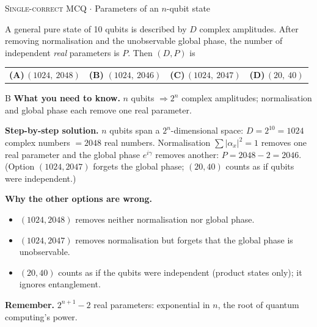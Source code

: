\documentclass[11pt,a4paper]{article}
\newcommand{\optlabel}[1]{\textbf{(#1)}}
\newcommand{\correctlabel}[1]{\textcolor{okgreen}{\textbf{(#1)}\,\ding{51}}}
\newenvironment{qitem}[1]{\begin{list}{}{\setlength{\leftmargin}{3.3em}\setlength{\labelwidth}{3.1em}%
  \setlength{\labelsep}{0.2em}\setlength{\topsep}{3pt}\setlength{\parsep}{3pt}}\item[\textbf{Q.#1}\hfill]}{\end{list}}
\newcommand{\qsep}{\par\vspace{2pt}{\color{black!15}\hrule}\vspace{4pt}}
\newcommand{\qmeta}[2]{{\footnotesize\color{black!60}\textsc{#1} \;$\cdot$\; #2}\par}
\begin{document}
\begin{qitem}{9}
\qmeta{Single-correct MCQ}{Parameters of an $n$-qubit state}
A general pure state of 10 qubits is described by $D$ complex amplitudes. After removing normalisation and
the unobservable global phase, the number of independent \emph{real} parameters is $P$. Then $(D, P)$ is
\par\smallskip\noindent\begin{tabularx}{\linewidth}{@{}*{4}{L}@{}}
\optlabel{A}\,$(1024,\ 2048)$ & \correctlabel{B}\,$(1024,\ 2046)$ & \optlabel{C}\,$(1024,\ 2047)$ & \optlabel{D}\,$(20,\ 40)$
\end{tabularx}
\end{qitem}
\begin{solbox}{B}
\textbf{\color{brand}What you need to know.} $n$ qubits $\Rightarrow 2^n$ complex amplitudes; normalisation and global phase each remove one real parameter.

\textbf{\color{brand}Step-by-step solution.} $n$ qubits span a $2^n$-dimensional space: $D = 2^{10} = 1024$ complex numbers $= 2048$ real numbers.
Normalisation $\sum|\alpha_x|^2 = 1$ removes one real parameter and the global phase $e^{i\gamma}$ removes another:
$P = 2048 - 2 = 2046$. (Option $(1024, 2047)$ forgets the global phase; $(20, 40)$ counts as if qubits were independent.)

\textbf{\color{brand}Why the other options are wrong.}
\begin{itemize}[leftmargin=2.4em, itemsep=1pt, topsep=2pt]
\item[\textbf{(A)}] $(1024, 2048)$ removes neither normalisation nor global phase.
\item[\textbf{(C)}] $(1024, 2047)$ removes normalisation but forgets that the global phase is unobservable.
\item[\textbf{(D)}] $(20, 40)$ counts as if the qubits were independent (product states only); it ignores entanglement.
\end{itemize}
\textbf{\color{brand}Remember.} $2^{n+1} - 2$ real parameters: exponential in $n$, the root of quantum computing's power.
\end{solbox}
\qsep
\end{document}
